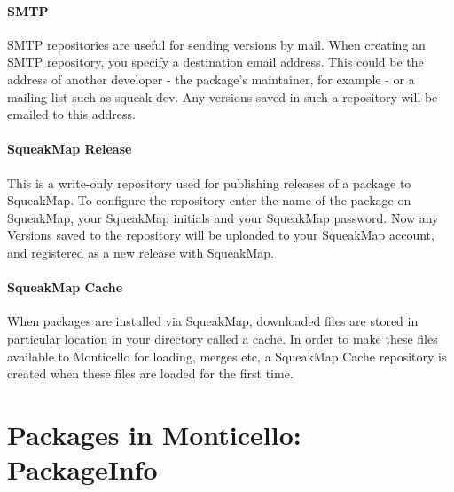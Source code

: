 \documentclass[a4paper,10pt,twoside]{book}
\begin{document}
\paragraph{SMTP} SMTP repositories are useful for sending versions by mail. When creating an SMTP repository, you specify a destination email address. This could be the address of another developer - the package's maintainer, for example - or a mailing list such as squeak-dev. Any versions saved in such a repository will be emailed to this address.

\paragraph{SqueakMap Release} This is a write-only repository used for publishing releases of a package to SqueakMap. To configure the repository enter the name of the package on SqueakMap, your SqueakMap initials and your SqueakMap password. Now any Versions saved to the repository will be uploaded to your SqueakMap account, and registered as a new release with SqueakMap.

\paragraph{SqueakMap Cache} When packages are installed via SqueakMap, downloaded files are stored in particular location in your directory called a cache. In order to make these files available to Monticello for loading, merges etc, a SqueakMap Cache repository is created when these files are loaded for the first time.






\section{Packages in Monticello: PackageInfo}
\end{document}
